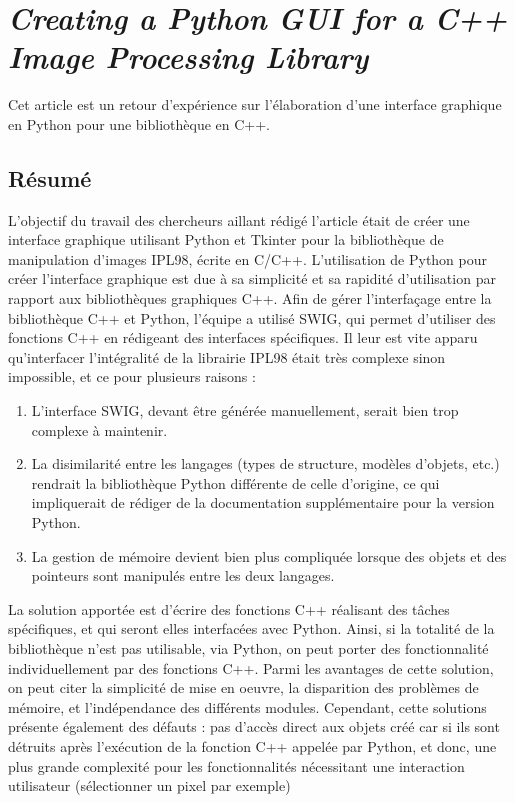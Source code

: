 \documentclass[11pt, french, screen]{report-rd-info}
\begin{document}
\section{\emph{Creating a Python GUI for a C++ Image Processing Library}}

Cet article \cite{2004CAPGFACIPLWuth} est un retour d'expérience sur l'élaboration d'une interface graphique en Python pour une bibliothèque en C++.

\subsection{Résumé}

L'objectif du travail des chercheurs aillant rédigé l'article était de créer une interface graphique utilisant Python et Tkinter pour la bibliothèque de manipulation d'images IPL98, écrite en C/C++.
L'utilisation de Python pour créer l'interface graphique est due à sa simplicité et sa rapidité d'utilisation par rapport aux bibliothèques graphiques C++.
Afin de gérer l'interfaçage entre la bibliothèque C++ et Python, l'équipe a utilisé SWIG, qui permet d'utiliser des fonctions C++ en rédigeant des interfaces spécifiques. Il leur est vite apparu qu'interfacer l'intégralité de la librairie IPL98 était très complexe sinon impossible, et ce pour plusieurs raisons :

\begin{enumerate}
\item L'interface SWIG, devant être générée manuellement, serait bien trop complexe à maintenir.
\item La disimilarité entre les langages (types de structure, modèles d'objets, etc.) rendrait la bibliothèque Python différente de celle d'origine, ce qui impliquerait de rédiger de la documentation supplémentaire pour la version Python.
\item La gestion de mémoire devient bien plus compliquée lorsque des objets et des pointeurs sont manipulés entre les deux langages.
\end{enumerate}

La solution apportée est d'écrire des fonctions C++ réalisant des tâches spécifiques, et qui seront elles interfacées avec Python. Ainsi, si la totalité de la bibliothèque n'est pas utilisable, via Python, on peut porter des fonctionnalité individuellement par des fonctions C++.
Parmi les avantages de cette solution, on peut citer la simplicité de mise en oeuvre, la disparition des problèmes de mémoire, et l'indépendance des différents modules.
Cependant, cette solutions présente également des défauts : pas d'accès direct aux objets créé car si ils sont détruits après l'exécution de la fonction C++ appelée par Python, et donc, une plus grande complexité pour les fonctionnalités nécessitant une interaction utilisateur (sélectionner un pixel par exemple)
\end{document}
